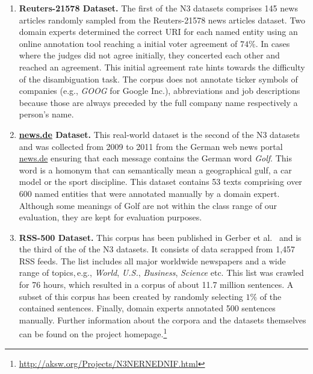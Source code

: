 \begin{enumerate}
\item \textbf{Reuters-21578 Dataset.}
The first of the N3 datasets comprises 145 news articles randomly sampled from the Reuters-21578 news articles dataset.
Two domain experts determined the correct URI for each named entity using an online annotation tool reaching a initial voter agreement of $74\%$.
In cases where the judges did not agree initially, they concerted each other and reached an agreement.
This initial agreement rate hints towards the difficulty of the disambiguation task.
The corpus does not annotate ticker symbols of companies (e.g., \textit{GOOG} for Google Inc.), abbreviations and job descriptions because those are always preceded by the full company name respectively a person's name.

\item \textbf{\url{news.de} Dataset.}
This real-world dataset is the second of the N3 datasets and was collected from 2009 to 2011 from the German web news portal \url{news.de} ensuring that each message contains the German word \emph{Golf}.
This word is a homonym that can semantically mean a geographical gulf, a car model or the sport discipline.
This dataset contains 53 texts comprising over 600 named entities that were annotated manually by a domain expert.
Although some meanings of Golf are not within the class range of our evaluation, they are kept for evaluation purposes.

\item \textbf{RSS-500 Dataset.}
This corpus has been published in Gerber et al.~\cite{GER+13} and is the third of the of the N3 datasets.
It consists of data scrapped from 1,457 RSS feeds. %
The list includes all major worldwide newspapers and a wide range of topics,\,e.g., \emph{World}, \emph{U.S.}, \emph{Business}, \emph{Science} etc.
This list was crawled for 76 hours, which resulted in a corpus of about 11.7 million sentences.
A subset of this corpus has been created by randomly selecting $1\%$ of the contained sentences.
Finally, domain experts annotated 500 sentences manually. 
Further information about the corpora and the datasets themselves can be found on the project homepage.\footnote{\url{http://aksw.org/Projects/N3NERNEDNIF.html}}


\end{enumerate}

